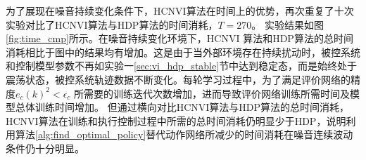 为了展现在噪音持续变化条件下，HCNVI算法在时间上的优势，再次重复了十次实验对比了HCNVI算法与HDP算法的时间消耗，$T=270$。
实验结果如图\ref{fig:time_cmp}所示。在噪音持续变化环境下，HCNVI
算法和HDP算法的总时间消耗相比于图中的结果均有增加。这是由于当外部环境存在持续扰动时，被控系统和控制模型参数不再如实验一\ref{sec:vi_hdp_stable}节中达到稳定态，而是始终处于震荡状态，被控系统轨迹数据不断变化。每轮学习过程中，为了满足评价网络的精度$e_{c}(k)^{2}<\epsilon_{c}$
所需要的训练迭代次数增加，进而导致评价网络训练所需时间及模型总体训练时间增加。
但通过横向对比HCNVI算法与HDP算法的总时间消耗，HCNVI算法在训练和执行控制过程中所需的总时间消耗仍明显少于HDP，说明利用算法\ref{alg:find_optimal_policy}替代动作网络所减少的时间消耗在噪音连续波动条件仍十分明显。



